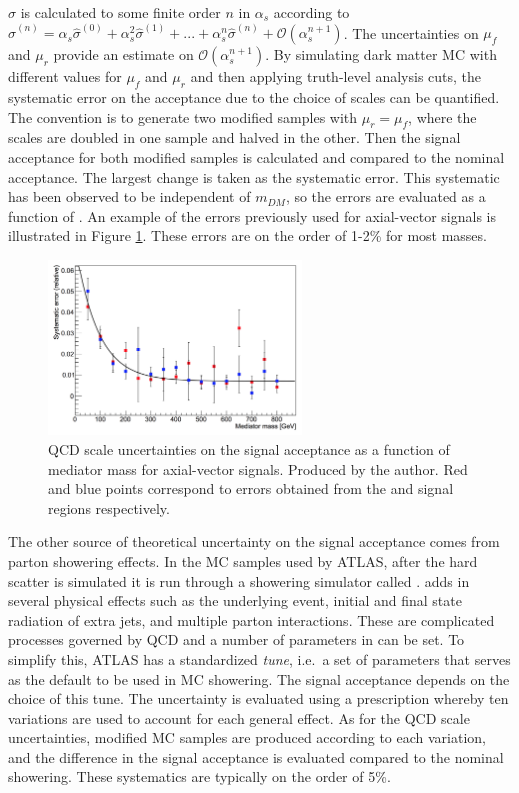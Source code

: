 $\hat{\sigma}$ is calculated to some finite order $n$ in $\alpha_s$ according to $\hat{\sigma}^{(n)} = \alpha_s \hat{\sigma}^{(0)} + \alpha_s^2 \hat{\sigma}^{(1)} + ... + \alpha_s^n \hat{\sigma}^{(n)} + \mathcal{O}(\alpha_s^{n+1})$. The uncertainties on $\mu_f$ and $\mu_r$ provide an estimate on $\mathcal{O}(\alpha_s^{n+1})$. By simulating dark matter MC with different values for $\mu_f$ and $\mu_r$ and then applying truth-level analysis cuts, the systematic error on the acceptance due to the choice of scales can be quantified. The convention is to generate two modified samples with $\mu_r = \mu_f$, where the scales are doubled in one sample and halved in the other. Then the signal acceptance for both modified samples is calculated and compared to the nominal acceptance. The largest change is taken as the systematic error. This systematic has been observed to be independent of $m_{DM}$, so the errors are evaluated as a function of \mmed. An example of the errors previously used for axial-vector signals is illustrated in Figure \ref{fig:qcd}. These errors are on the order of 1-2\% for most masses.

\begin{figure}[htb]
\centering
\includegraphics[width=0.6\textwidth]{Figures/qcd.png}
\caption{QCD scale uncertainties on the signal acceptance as a function of mediator mass for axial-vector signals. Produced by the author. Red and blue points correspond to errors obtained from the \ee and \mm signal regions respectively.}
\label{fig:qcd}
\end{figure}

The other source of theoretical uncertainty on the signal acceptance comes from parton showering effects. In the MC samples used by ATLAS, after the hard scatter is simulated it is run through a showering simulator called \pythia \cite{Sjostrand:2014zea}. \pythia adds in several physical effects such as the underlying event, initial and final state radiation of extra jets, and multiple parton interactions. These are complicated processes governed by QCD and a number of parameters in \pythia can be set. To simplify this, ATLAS has a standardized \pythia \textit{tune}, i.e.\ a set of parameters that serves as the default to be used in MC showering. The signal acceptance depends on the choice of this tune. The uncertainty is evaluated using a prescription whereby ten variations are used to account for each general effect. As for the QCD scale uncertainties, modified MC samples are produced according to each variation, and the difference in the signal acceptance is evaluated compared to the nominal showering. These systematics are typically on the order of 5\%.


